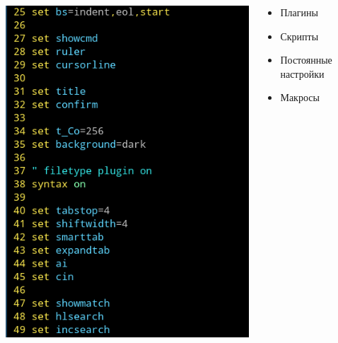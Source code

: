 \documentclass[aspectratio=169]{beamer}
\begin{document}
\begin{frame}
\begin{columns}[T,onlytextwidth]
\begin{column}{0.24\textwidth}
                \includegraphics[width=\textwidth]{vimrc2}
            \end{column}
            \begin{column}{0.5\textwidth}
                \begin{itemize}
                    \item Плагины
                    \item Скрипты
                    \item Постоянные настройки
                    \item Макросы
                \end{itemize}
            \end{column}
        \end{columns}
    \end{frame}
\end{document}
